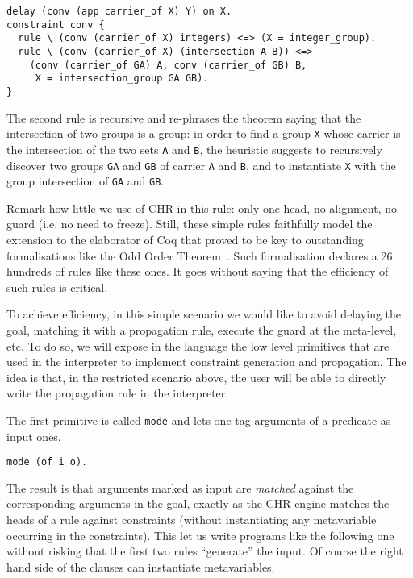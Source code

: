 \documentclass{easychair}
\begin{document}
\begin{Verbatim}
delay (conv (app carrier_of X) Y) on X.
constraint conv {
  rule \ (conv (carrier_of X) integers) <=> (X = integer_group).
  rule \ (conv (carrier_of X) (intersection A B)) <=>
    (conv (carrier_of GA) A, conv (carrier_of GB) B,
     X = intersection_group GA GB).
}
\end{Verbatim}

The second rule is recursive and re-phrases the theorem saying
that the intersection of two groups is a group: in order to find a group \verb+X+ whose carrier is the intersection of the two sets \verb+A+ and \verb+B+, the heuristic suggests to recursively discover two groups \verb+GA+ and \verb+GB+ of carrier \verb+A+ and \verb+B+, and to instantiate \verb+X+ with the group intersection of \verb+GA+ and \verb+GB+.

Remark how little we use of CHR in this rule: only one head, no alignment,
no guard (i.e. no need to freeze).
Still, these simple rules faithfully model the extension to the elaborator
of Coq that proved to be key to outstanding formalisations like
the Odd Order Theorem~\cite{oothm}.  Such formalisation declares a 26
hundreds of rules like these ones.  It goes without saying that
the efficiency of such rules is critical.

To achieve efficiency, in this simple scenario we would like to avoid delaying the goal, matching it with a propagation rule, execute the guard at the meta-level, etc. To do so, we will expose in the language the low level primitives that are used in the interpreter to implement constraint generation and propagation. The idea is that, in the restricted scenario above, the user will be able to directly write the propagation rule in the interpreter.

The first primitive is called \verb+mode+ and lets one tag arguments of
a predicate as input ones.

\begin{Verbatim}
mode (of i o).
\end{Verbatim}

The result is that arguments marked as input are \emph{matched}
against the corresponding arguments in the goal, exactly as the
CHR engine matches the heads of a rule against constraints (without
instantiating any metavariable occurring in the constraints).
This let us write programs like the following one without risking that
the first two rules ``generate'' the input.  Of course the right
hand side of the clauses can instantiate metavariables.
\end{document}
